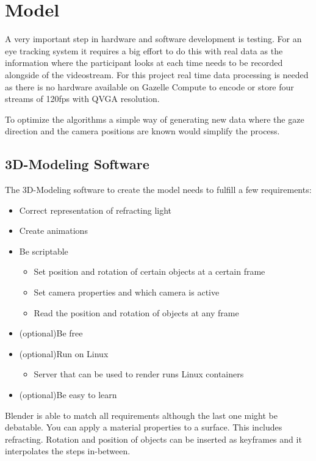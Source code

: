 \chapter{Model}
\label{chap:Model}

A very important step in hardware and software development is testing. For an eye tracking system it requires a big effort to do this with real data as the information where the participant looks at each time needs to be recorded alongside of the videostream. For this project real time data processing is needed as there is no hardware available on Gazelle Compute to encode or store four streams of 120fps with QVGA resolution.

To optimize the algorithms a simple way of generating new data where the gaze direction and the camera positions are known would simplify the process. 
\section{3D-Modeling Software}
\label{sec:whatIsImportant}

The 3D-Modeling software to create the model needs to fulfill a few requirements:
\begin{itemize}
	\item Correct representation of refracting light
	\item Create animations 
	\item Be scriptable
	\begin{itemize}
		\item Set position and rotation of certain objects at a certain frame
		\item Set camera properties and which camera is active
		\item Read the position and rotation of objects at any frame
	\end{itemize}
	\item (optional)Be free
	\item (optional)Run on Linux
	\begin{itemize}
		\item Server that can be used to render runs Linux containers
	\end{itemize}
	\item (optional)Be easy to learn
\end{itemize}

Blender is able to match all requirements although the last one might be debatable. You can apply a material properties to a surface. This includes refracting. Rotation and position of objects can be inserted as keyframes and it interpolates the steps in-between. 

